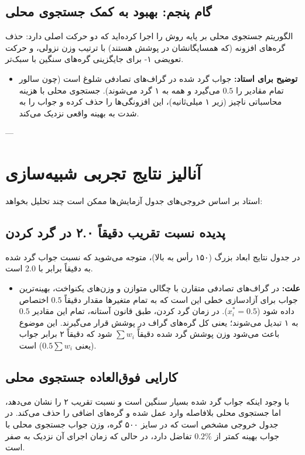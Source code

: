 \documentclass[12pt,a4paper]{article}
\begin{document}
\subsection{گام پنجم: بهبود به کمک جستجوی محلی }
الگوریتم جستجوی محلی بر پایه روش  را اجرا کرده‌اید که دو حرکت اصلی دارد: حذف گره‌های افزونه (که همسایگانشان در پوشش هستند) با ترتیب وزن نزولی، و حرکت تعویضی ۱- برای جایگزینی گره‌های سنگین با سبک‌تر.
\begin{itemize}
    \item \textbf{توضیح برای استاد:} جواب گرد شده در گراف‌های تصادفی شلوغ است (چون سالور تمام مقادیر را $0.5$ می‌گیرد و همه به ۱ گرد می‌شوند). جستجوی محلی با هزینه محاسباتی ناچیز (زیر ۱ میلی‌ثانیه)، این افزونگی‌ها را حذف کرده و جواب را به شدت به بهینه واقعی نزدیک می‌کند.
\end{itemize}

---

\section{آنالیز نتایج تجربی شبیه‌سازی}

استاد بر اساس خروجی‌های جدول آزمایش‌ها ممکن است چند تحلیل بخواهد:

\subsection{پدیده نسبت تقریب دقیقاً ۲.۰ در گرد کردن}
در جدول نتایج ابعاد بزرگ (۱۵۰ رأس به بالا)، متوجه می‌شوید که نسبت جواب گرد شده به  دقیقاً برابر با $2.0$ است.
\begin{itemize}
    \item \textbf{علت:} در گراف‌های تصادفی متقارن با چگالی متوازن و وزن‌های یکنواخت، بهینه‌ترین جواب برای آزادسازی خطی این است که به تمام متغیرها مقدار دقیقاً $0.5$ اختصاص داده شود ($x_i^* = 0.5$). در زمان گرد کردن، طبق قانون آستانه، تمام این مقادیر $0.5$ به ۱ تبدیل می‌شوند؛ یعنی کل گره‌های گراف در پوشش قرار می‌گیرند. این موضوع باعث می‌شود وزن پوشش گرد شده دقیقاً $\sum w_i$ شود که دقیقاً ۲ برابر جواب  (یعنی $0.5 \sum w_i$) است.
\end{itemize}

\subsection{کارایی فوق‌العاده جستجوی محلی}
با وجود اینکه جواب گرد شده بسیار سنگین است و نسبت تقریب ۲ را نشان می‌دهد، اما جستجوی محلی بلافاصله وارد عمل شده و گره‌های اضافی را حذف می‌کند. در جدول خروجی مشخص است که در سایز ۵۰۰ گره، وزن جواب جستجوی محلی با جواب بهینه  کمتر از $0.2\%$ تفاضل دارد، در حالی که زمان اجرای آن نزدیک به صفر است.
\end{document}
